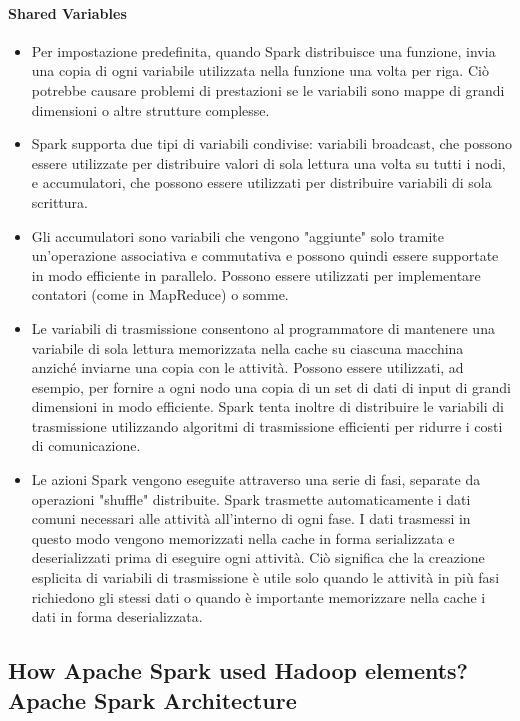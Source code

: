 \documentclass{article}
\begin{document}
\paragraph{Shared Variables}
\begin{itemize}
    \item Per impostazione predefinita, quando Spark distribuisce una funzione, invia una copia di ogni variabile utilizzata nella funzione una volta per riga. Ciò potrebbe causare problemi di prestazioni se le variabili sono mappe di grandi dimensioni o altre strutture complesse.
    \item Spark supporta due tipi di variabili condivise: variabili broadcast, che possono essere utilizzate per distribuire valori di sola lettura una volta su tutti i nodi, e accumulatori, che possono essere utilizzati per distribuire variabili di sola scrittura.
    \item Gli accumulatori sono variabili che vengono "aggiunte" solo tramite un'operazione associativa e commutativa e possono quindi essere supportate in modo efficiente in parallelo. Possono essere utilizzati per implementare contatori (come in MapReduce) o somme.
    \item Le variabili di trasmissione consentono al programmatore di mantenere una variabile di sola lettura memorizzata nella cache su ciascuna macchina anziché inviarne una copia con le attività. Possono essere utilizzati, ad esempio, per fornire a ogni nodo una copia di un set di dati di input di grandi dimensioni in modo efficiente. Spark tenta inoltre di distribuire le variabili di trasmissione utilizzando algoritmi di trasmissione efficienti per ridurre i costi di comunicazione.
    \item Le azioni Spark vengono eseguite attraverso una serie di fasi, separate da operazioni "shuffle" distribuite. Spark trasmette automaticamente i dati comuni necessari alle attività all'interno di ogni fase. I dati trasmessi in questo modo vengono memorizzati nella cache in forma serializzata e deserializzati prima di eseguire ogni attività. Ciò significa che la creazione esplicita di variabili di trasmissione è utile solo quando le attività in più fasi richiedono gli stessi dati o quando è importante memorizzare nella cache i dati in forma deserializzata.
\end{itemize}

\subsection{How Apache Spark used Hadoop elements? Apache Spark Architecture}
\end{document}
